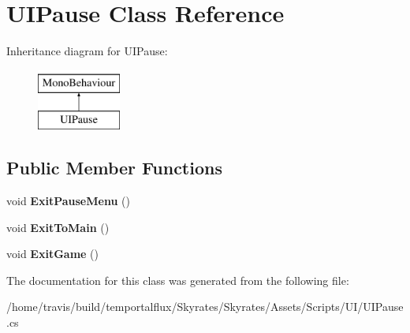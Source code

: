 \hypertarget{class_u_i_pause}{\section{U\-I\-Pause Class Reference}
\label{class_u_i_pause}
}
Inheritance diagram for U\-I\-Pause\-:\begin{figure}[H]
\begin{center}
\leavevmode
\includegraphics[height=2.000000cm]{class_u_i_pause}
\end{center}
\end{figure}
\subsection*{Public Member Functions}
\begin{DoxyCompactItemize}
\item 
\hypertarget{class_u_i_pause_a248f9f39e66804262c6d64d5118e71e3}{void {\bfseries Exit\-Pause\-Menu} ()}\label{class_u_i_pause_a248f9f39e66804262c6d64d5118e71e3}

\item 
\hypertarget{class_u_i_pause_a0df23a6d819608fdf71e6aa8e9c09aa8}{void {\bfseries Exit\-To\-Main} ()}\label{class_u_i_pause_a0df23a6d819608fdf71e6aa8e9c09aa8}

\item 
\hypertarget{class_u_i_pause_af2cafb379c25e54aec735ff7b3973ffe}{void {\bfseries Exit\-Game} ()}\label{class_u_i_pause_af2cafb379c25e54aec735ff7b3973ffe}

\end{DoxyCompactItemize}


The documentation for this class was generated from the following file\-:\begin{DoxyCompactItemize}
\item 
/home/travis/build/temportalflux/\-Skyrates/\-Skyrates/\-Assets/\-Scripts/\-U\-I/U\-I\-Pause.\-cs\end{DoxyCompactItemize}
